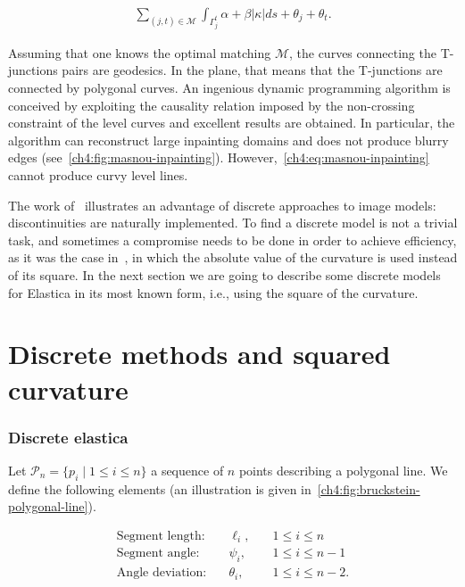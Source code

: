 \begin{align}
	\sum_{(j,t) \in \mathcal{M}}{ \int_{\Gamma_j^t}{\alpha + \beta |\kappa|ds} + \theta_j + \theta_t }.
	\label{ch4:eq:masnou-inpainting}
\end{align}


Assuming that one knows the optimal matching $\mathcal{M}$, the curves connecting the T-junctions pairs are geodesics. In the plane, that means that the T-junctions are connected by polygonal curves. An ingenious dynamic programming algorithm is conceived  by exploiting the causality relation imposed by the non-crossing constraint of the level curves and excellent results are obtained. In particular, the algorithm can reconstruct large inpainting domains and does not produce blurry edges (see~\cref{ch4:fig:masnou-inpainting}). However,~\cref{ch4:eq:masnou-inpainting} cannot produce curvy level lines.


The work of~\cite{masnou98inpainting} illustrates an advantage of discrete approaches to image models: discontinuities are naturally implemented. To find a discrete model is not a trivial task, and sometimes a compromise needs to be done in order to achieve efficiency, as it was the case in~\cite{masnou98inpainting}, in which the absolute value of the curvature is used instead of its square. In the next section we are going to describe some discrete models for Elastica in its most known form, i.e., using the square of the curvature.


\section{Discrete methods and squared curvature}
\label{ch4:sec:discrete-methods-squared-curvature}

\subsubsection{Discrete elastica}

Let $\mathcal{P}_n=\{p_i \; | \; 1 \leq i \leq n\}$ a sequence of $n$ points describing a polygonal line. We define the following elements (an illustration is given in~\cref{ch4:fig:bruckstein-polygonal-line}).

\[
\begin{array}{rll}
\text{Segment length:} & \quad \ell_i,& \quad 1 \leq i \leq n\\[0.5em]
\text{Segment angle:} & \quad \psi_i,& \quad 1 \leq i \leq n-1\\[0.5em]
\text{Angle deviation:} & \quad \theta_i,& \quad 1 \leq i \leq n-2.
\end{array}
\]

